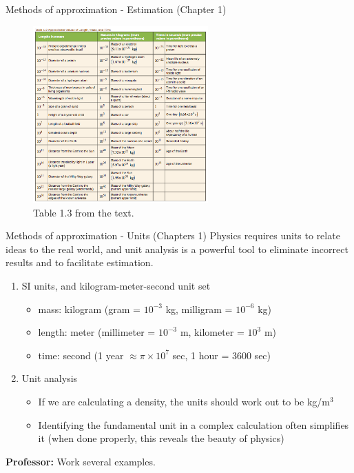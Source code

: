 \documentclass{beamer}
\begin{document}
\begin{frame}{Methods of approximation - Estimation (Chapter 1)}
\begin{figure}
\centering
\includegraphics[width=0.6\textwidth]{figures/tab1.png}
\caption{\label{fig:tab1} Table 1.3 from the text.}
\end{figure}
\end{frame}

\begin{frame}{Methods of approximation - Units (Chapters 1)}
Physics requires \alert{units} to relate ideas to the real world, and \alert{unit analysis} is a powerful tool to eliminate incorrect results and to facilitate estimation.
\begin{enumerate}
\item SI units, and kilogram-meter-second unit set
\begin{itemize}
\item mass: \alert{kilogram} (gram = $10^{-3}$ kg, milligram = $10^{-6}$ kg)
\item length: \alert{meter} (millimeter = $10^{-3}$ m, kilometer = $10^{3}$ m)
\item time: \alert{second} (1 year $\approx \pi \times 10^{7}$ sec, 1 hour = 3600 sec)
\end{itemize}
\item Unit analysis
\begin{itemize}
\item If we are calculating a density, the units should work out to be kg/m$^3$
\item Identifying the fundamental unit in a complex calculation often simplifies it (when done properly, this reveals the beauty of physics)
\end{itemize}
\end{enumerate}
\textbf{Professor:} Work several examples.
\end{frame}
\end{document}
